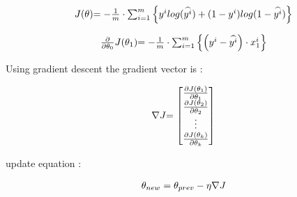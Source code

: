 \[
	\begin{array}{ l@{} l@{} } 
		J(\theta)
		& =
		-
		\frac{1}{m}
		\cdot
		\sum_{i=1}^{m}
		\left\{
			y^{i}
			log(\widehat{y^{i}})
			+
			(1 - y^{i})
			log(1-\widehat{y^{i}})
		\right\}
	\end{array}
\]

\[
	\begin{array}{ l@{} l@{} } 
		\frac{\partial}{\partial \theta_0} J(\theta_1)
		& =
		-
		\frac{1}{m}
		\cdot 
		\sum_{i=1}^m
		\left\{
			\left(
				y^{i} - \widehat{y^{i}}
			\right)
			\cdot
			x_{1}^{i}
		\right\} 
	\end{array}
\]

Using gradient descent the gradient vector is :

\[
	\begin{array}{ l@{} l@{} } 
		\nabla J
		& = 
		\begin{bmatrix} 
			\frac{\partial J(\theta_1)}{\partial \theta_1}  \\ 
			\frac{\partial J(\theta_2)}{\partial \theta_2}  \\ 
			\vdots \\ 
			\frac{\partial J(\theta_k)}{\partial \theta_k}  \\ 
		\end{bmatrix} 
	\end{array}
\]

update equation :

\[
	\begin{array}{ l@{} l@{} } 
	\theta_{new} = \theta_{prev} - \eta \nabla J 
	\end{array}
\]




